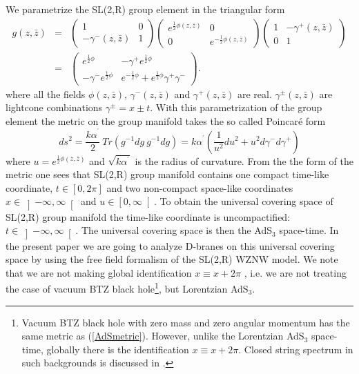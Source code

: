 \documentclass[a4paper,12pt]{article}
\begin{document}
We parametrize the SL(2,R) group element in the triangular form
\begin{eqnarray}
g\left( z,\bar{z}\right) &=&\left(
\begin{array}{cc}
1 & 0 \\
-\gamma ^{-}\left( z,\bar{z}\right) & 1
\end{array}
\right) \left(
\begin{array}{cc}
e^{\frac{1}{2}\phi \left( z,\bar{z}\right) } & 0 \\
0 & e^{-\frac{1}{2}\phi \left( z,\bar{z}\right) }
\end{array}
\right) \left(
\begin{array}{cc}
1 & -\gamma ^{+}\left( z,\bar{z}\right) \\
0 & 1
\end{array}
\right)  \nonumber \\
&=&\left(
\begin{array}{cc}
e^{\frac{1}{2}\phi } & -\gamma ^{+}e^{\frac{1}{2}\phi } \\
-\gamma ^{-}e^{\frac{1}{2}\phi } & e^{-\frac{1}{2}\phi }+e^{\frac{1}{2}\phi
}\gamma ^{+}\gamma ^{-}
\end{array}
\right) .  \label{figamma}
\end{eqnarray}
where all the fields $\phi \left( z,\bar{z}\right) $, $\gamma ^{-}\left( z,%
\bar{z}\right) $ and $\gamma ^{+}\left( z,\bar{z}\right) $ are real. $\gamma
^{\pm }\left( z,\bar{z}\right) $ are lightcone combinations $\gamma ^{\pm
}=x\pm t$. With this parametrization of the group element the metric on the
group manifold takes the so called Poincar\'{e} form
\begin{equation}
ds^{2}=\frac{k\alpha ^{^{\prime }}}{2}\ Tr\left( g^{-1}dg\ g^{-1}dg\right)
=k\alpha ^{^{\prime }}\left( \frac{1}{u^{2}}du^{2}+u^{2}d\gamma ^{-}d\gamma
^{+}\right)  \label{AdSmetric}
\end{equation}
where $u=e^{\frac{1}{2}\phi \left( z,\bar{z}\right) }$ and $\sqrt{k\alpha
^{^{\prime }}}$ is the radius of curvature. From the the form of the metric
one sees that SL(2,R) group manifold contains one compact time-like
coordinate, $t\in \left[ 0,2\pi \right] $ and two non-compact space-like
coordinates $x\in \left] -\infty ,\infty \right[ $ and $u\in \left[ 0,\infty
\right[ $. To obtain the universal covering space of SL(2,R) group manifold
the time-like coordinate is uncompactified: $t\in \left] -\infty ,\infty
\right[ $. The universal covering space is then the AdS$_{3}$ space-time. In
the present paper we are going to analyze D-branes on this universal
covering space by using the free field formalism of the SL(2,R) WZNW
model. We note that we are not making global identification $x\equiv x+2\pi $%
, i.e. we are not treating the case of vacuum BTZ black hole\footnote{%
Vacuum BTZ black hole with zero mass and zero angular momentum has the same
metric as (\ref{AdSmetric}). However, unlike the Lorentzian AdS$_{3}$
space-time, globally there is the identification $x\equiv x+2\pi $. Closed
string spectrum in such backgrounds is discussed in \cite{troost}.}, but
Lorentzian AdS$_{3}$.
\end{document}
